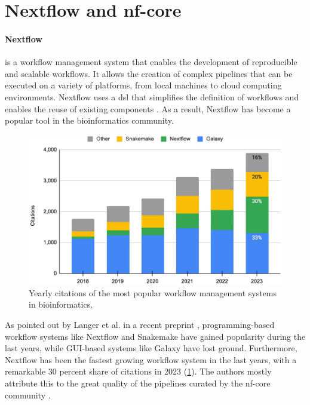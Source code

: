 \section{Nextflow and nf-core}
\label{sec:nextflow_and_nf-core}
\paragraph{Nextflow} is a workflow management system that enables the
development of reproducible and scalable workflows.
It allows the creation of complex pipelines that can be executed on a variety
of platforms, from local machines to cloud computing environments.
Nextflow uses a \gls{dsl} that simplifies the definition of workflows and
enables the reuse of existing components \supercite{di_tommaso_nextflow_2017}.
As a result, Nextflow has become a popular tool in the bioinformatics
community.

\begin{figure}[ht]
    \centering

    \includegraphics[width=\textwidth]{chapters/3_materials_and_methods/figures/nextflow_usage.jpg}
    \caption{Yearly citations of the most popular workflow management systems
        in bioinformatics.}
    \label{fig:nextflow_usage}
\end{figure}

As pointed out by Langer et al.
in a recent preprint
\supercite{langer_empowering_2024}, programming-based workflow systems like
Nextflow and Snakemake have gained popularity during the last years, while
GUI-based systems like Galaxy have lost ground.
Furthermore, Nextflow has been the fastest growing workflow system in the last
years, with a remarkable 30 percent share of citations in 2023
(\cref{fig:nextflow_usage}).
The authors mostly attribute this to the great quality of the pipelines curated
by the nf-core community
\supercite{langer_empowering_2024,grayson_automatic_2023}.

